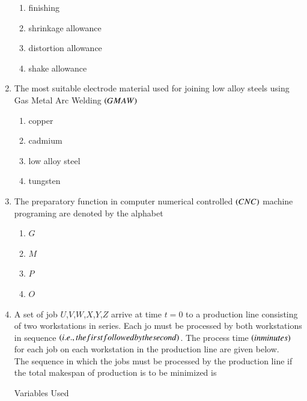 \documentclass[journal]{IEEEtran}
\begin{document}
\begin{enumerate}
\begin{enumerate}
    \item finishing\\
    \item shrinkage allowance\\
    \item distortion allowance\\
    \item shake allowance   
\end{enumerate}
   \item The most suitable electrode material used for joining low alloy steels using Gas Metal Arc Welding $\left(GMAW\right)$\\
 \begin{enumerate}
   \item copper\\
   \item cadmium\\
   \item low alloy steel\\
   \item tungsten
 \end{enumerate}
 \item The preparatory function in computer numerical controlled $\left(CNC\right)$ machine programing are denoted by the alphabet\\
 \begin{enumerate}
     \item $G$\\
     \item $M$\\
     \item $P$\\
     \item $O$
 \end{enumerate}
 \item A set of job $U$,$V$,$W$,$X$,$Y$,$Z$ arrive at time $t=0$ to a production line consisting of two workstations in series. Each jo must be processed by both workstations in sequence $\left(i.e., the first followed by the second\right)$. The process time $\left(in minutes\right)$ for each job on each workstation in the production line are given below.\\

 The sequence in which the jobs must be processed by the production line if the total makespan of production is to be minimized is\\
\begin{table}[h!]    
  \centering
  
  \caption{Variables Used}
  \label{tab1-1.2-20}
\end{table}
 

\end{enumerate}
\end{document}
